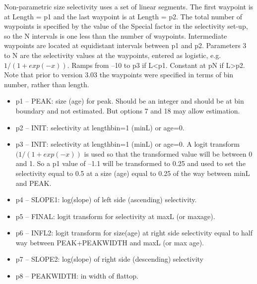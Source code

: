 Non-parametric size selectivity uses a set of linear segments.  The first waypoint is at Length = p1 and the last waypoint is at Length = p2.  The total number of waypoints is specified by the value of the Special factor in the selectivity set-up, so the N intervals is one less than the number of waypoints.  Intermediate waypoints are located at equidistant intervals between p1 and p2.  Parameters 3 to N are the selectivity values at the waypoints, entered as logistic, e.g. $1/(1+exp(-x))$.  Ramps from –10 to p3 if L<p1.  Constant at pN if L>p2.  Note that prior to version 3.03 the waypoints were specified in terms of bin number, rather than length.

	\begin{itemize}
		\item  p1 – PEAK:  size (age) for peak. Should be an integer and should be at bin boundary and not estimated.  But options 7 and 18 may allow estimation.
		\item p2 – INIT:  selectivity at lengthbin=1 (minL) or age=0.
		\item p3 – INIT:  selectivity at lengthbin=1 (minL) or age=0. A logit transform $(1/(1+exp(-x))$ is used so that the transformed value will be between 0 and 1.  So a p1 value of –1.1 will be transformed to 0.25 and used to set the selectivity equal to 0.5 at a size (age) equal to 0.25 of the way between minL and PEAK. 
		\item p4 – SLOPE1:  log(slope) of left side (ascending) selectivity.
		\item p5 – FINAL:  logit transform for selectivity at maxL (or maxage).
		\item p6 – INFL2:  logit transform for size(age) at right side selectivity equal to half way between PEAK+PEAKWIDTH and maxL (or max age).
		\item p7 – SLOPE2:  log(slope) of right side (descending) selectivity
		\item p8 – PEAKWIDTH:  in width of flattop.
	\end{itemize}

